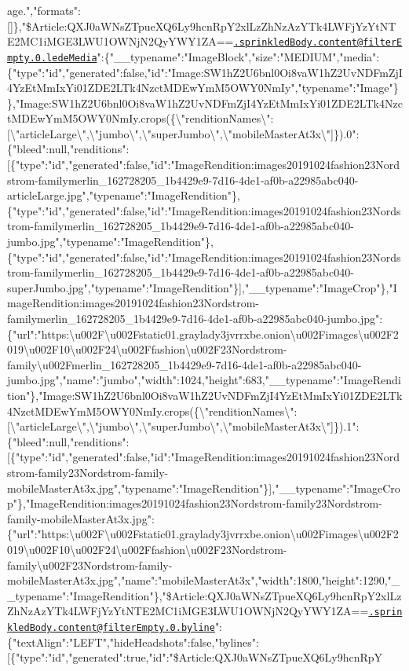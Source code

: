 age.","formats":{[}{]}\},"\$Article:QXJ0aWNsZTpueXQ6Ly9hcnRpY2xlLzZhNzAzYTk4LWFjYzYtNTE2MC1iMGE3LWU1OWNjN2QyYWY1ZA==\href{mailto:.sprinkledBody.content@filterEmpty.0.ledeMedia}{\nolinkurl{.sprinkledBody.content@filterEmpty.0.ledeMedia}}":\{"\_\_typename":"ImageBlock","size":"MEDIUM","media":\{"type":"id","generated":false,"id":"Image:SW1hZ2U6bnl0Oi8vaW1hZ2UvNDFmZjI4YzEtMmIxYi01ZDE2LTk4NzctMDEwYmM5OWY0NmIy","typename":"Image"\}\},"Image:SW1hZ2U6bnl0Oi8vaW1hZ2UvNDFmZjI4YzEtMmIxYi01ZDE2LTk4NzctMDEwYmM5OWY0NmIy.crops(\{\textbackslash{}"renditionNames\textbackslash{}":{[}\textbackslash{}"articleLarge\textbackslash{}",\textbackslash{}"jumbo\textbackslash{}",\textbackslash{}"superJumbo\textbackslash{}",\textbackslash{}"mobileMasterAt3x\textbackslash{}"{]}\}).0":\{"bleed":null,"renditions":{[}\{"type":"id","generated":false,"id":"ImageRendition:images20191024fashion23Nordstrom-familymerlin\_162728205\_1b4429e9-7d16-4de1-af0b-a22985abc040-articleLarge.jpg","typename":"ImageRendition"\},\{"type":"id","generated":false,"id":"ImageRendition:images20191024fashion23Nordstrom-familymerlin\_162728205\_1b4429e9-7d16-4de1-af0b-a22985abc040-jumbo.jpg","typename":"ImageRendition"\},\{"type":"id","generated":false,"id":"ImageRendition:images20191024fashion23Nordstrom-familymerlin\_162728205\_1b4429e9-7d16-4de1-af0b-a22985abc040-superJumbo.jpg","typename":"ImageRendition"\}{]},"\_\_typename":"ImageCrop"\},"ImageRendition:images20191024fashion23Nordstrom-familymerlin\_162728205\_1b4429e9-7d16-4de1-af0b-a22985abc040-jumbo.jpg":\{"url":"https:\textbackslash{}u002F\textbackslash{}u002Fstatic01.graylady3jvrrxbe.onion\textbackslash{}u002Fimages\textbackslash{}u002F2019\textbackslash{}u002F10\textbackslash{}u002F24\textbackslash{}u002Ffashion\textbackslash{}u002F23Nordstrom-family\textbackslash{}u002Fmerlin\_162728205\_1b4429e9-7d16-4de1-af0b-a22985abc040-jumbo.jpg","name":"jumbo","width":1024,"height":683,"\_\_typename":"ImageRendition"\},"Image:SW1hZ2U6bnl0Oi8vaW1hZ2UvNDFmZjI4YzEtMmIxYi01ZDE2LTk4NzctMDEwYmM5OWY0NmIy.crops(\{\textbackslash{}"renditionNames\textbackslash{}":{[}\textbackslash{}"articleLarge\textbackslash{}",\textbackslash{}"jumbo\textbackslash{}",\textbackslash{}"superJumbo\textbackslash{}",\textbackslash{}"mobileMasterAt3x\textbackslash{}"{]}\}).1":\{"bleed":null,"renditions":{[}\{"type":"id","generated":false,"id":"ImageRendition:images20191024fashion23Nordstrom-family23Nordstrom-family-mobileMasterAt3x.jpg","typename":"ImageRendition"\}{]},"\_\_typename":"ImageCrop"\},"ImageRendition:images20191024fashion23Nordstrom-family23Nordstrom-family-mobileMasterAt3x.jpg":\{"url":"https:\textbackslash{}u002F\textbackslash{}u002Fstatic01.graylady3jvrrxbe.onion\textbackslash{}u002Fimages\textbackslash{}u002F2019\textbackslash{}u002F10\textbackslash{}u002F24\textbackslash{}u002Ffashion\textbackslash{}u002F23Nordstrom-family\textbackslash{}u002F23Nordstrom-family-mobileMasterAt3x.jpg","name":"mobileMasterAt3x","width":1800,"height":1290,"\_\_typename":"ImageRendition"\},"\$Article:QXJ0aWNsZTpueXQ6Ly9hcnRpY2xlLzZhNzAzYTk4LWFjYzYtNTE2MC1iMGE3LWU1OWNjN2QyYWY1ZA==\href{mailto:.sprinkledBody.content@filterEmpty.0.byline}{\nolinkurl{.sprinkledBody.content@filterEmpty.0.byline}}":\{"textAlign":"LEFT","hideHeadshots":false,"bylines":{[}\{"type":"id","generated":true,"id":"\$Article:QXJ0aWNsZTpueXQ6Ly9hcnRpY